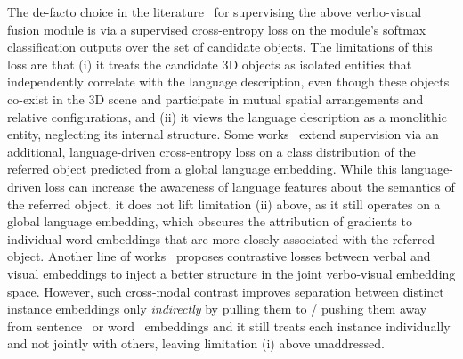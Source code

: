 \documentclass[10pt,twocolumn,letterpaper]{article}
\begin{document}
The de-facto choice in the literature~\cite{zhao2021_3DVG_Transformer,unal2023ways,yuan2021instancerefer,jain2022bottom,chen2020scanrefer} for supervising the above verbo-visual fusion module is via a supervised cross-entropy loss on the module's softmax classification outputs over the set of candidate objects. The limitations of this loss are that (i) it treats the candidate 3D objects as isolated entities that independently correlate with the language description, even though these objects co-exist in the 3D scene and participate in mutual spatial arrangements and relative configurations, and (ii) it views the language description as a monolithic entity, neglecting its internal structure. Some works~\cite{huang2022multiview,zhao2021_3DVG_Transformer,achlioptas2020referit_3d} extend supervision via an additional, language-driven cross-entropy loss on a class distribution of the referred object predicted from a global language embedding. While this language-driven loss can increase the awareness of language features about the semantics of the referred object, it does not lift limitation (ii) above, as it still operates on a global language embedding, which obscures the attribution of gradients to individual word embeddings that are more closely associated with the referred object. Another line of works~\cite{jain2022bottom,unal2023ways} proposes contrastive losses between verbal and visual embeddings to inject a better structure in the joint verbo-visual embedding space. However, such cross-modal contrast improves separation between distinct instance embeddings only \emph{indirectly} by pulling them to / pushing them away from sentence~\cite{unal2023ways} or word~\cite{jain2022bottom} embeddings and it still treats each instance individually and not jointly with others, leaving limitation (i) above unaddressed.
\end{document}
